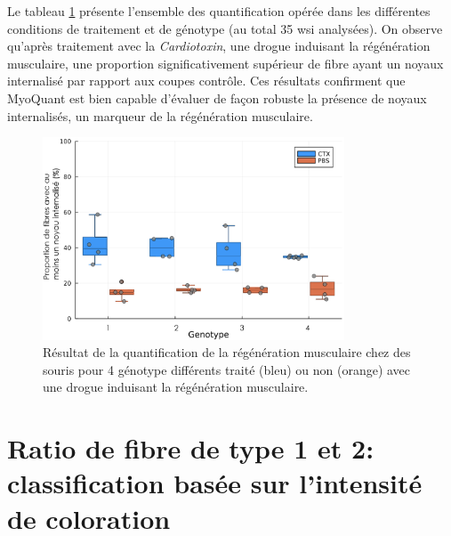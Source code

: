 Le tableau \ref{fig:fluo_compil} présente l'ensemble des quantification opérée dans les différentes conditions de traitement et de génotype (au total 35 \gls{wsi} analysées). On observe qu'après traitement avec la \textit{Cardiotoxin}, une drogue induisant la régénération musculaire, une proportion significativement supérieur de fibre ayant un noyaux internalisé par rapport aux coupes contrôle. Ces résultats confirment que MyoQuant est bien capable d'évaluer de façon robuste la présence de noyaux internalisés, un marqueur de la régénération musculaire.

\begin{figure}[htbp]
 \centering
 \includegraphics[width=0.8\textwidth]{figures/fluo_compil.png}
 \caption[Résultat de la quantification de la régénération musculaire]{Résultat de la quantification de la régénération musculaire chez des souris pour 4 génotype différents traité (bleu) ou non (orange) avec une drogue induisant la régénération musculaire.}
 \label{fig:fluo_compil}
\end{figure}

\section{Ratio de fibre de type 1 et 2: classification basée sur l'intensité de coloration}


